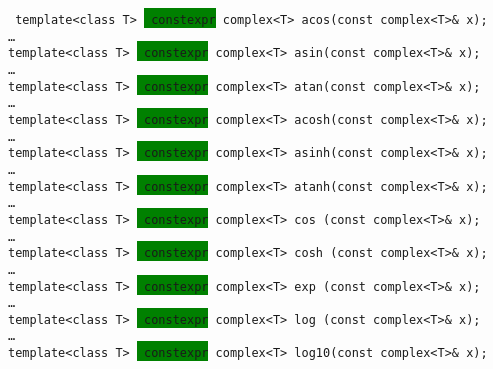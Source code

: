 \documentclass[prd,twocolumn,amsmath,amssymb,nofootinbib,eqsecnum]{revtex4-1}
\newcommand{\code}[1]{{\tt #1}}
\newcommand{\highlight}[1]{\colorbox{green}{\!\!\!\! #1}}
\begin{document}
\code{
  	template<class T> \highlight{constexpr} complex<T> acos(const complex<T>\& x);\\

	\ldots\\

	template<class T> \highlight{constexpr} complex<T> asin(const complex<T>\& x);\\

	\ldots\\

	template<class T> \highlight{constexpr} complex<T> atan(const complex<T>\& x);\\

	\ldots\\

  	template<class T> \highlight{constexpr} complex<T> acosh(const complex<T>\& x);\\

	\ldots\\

	template<class T> \highlight{constexpr} complex<T> asinh(const complex<T>\& x);\\

	\ldots\\

	template<class T> \highlight{constexpr} complex<T> atanh(const complex<T>\& x);\\

	\ldots\\

	template<class T> \highlight{constexpr} complex<T> cos  (const complex<T>\& x);\\

	\ldots\\

	template<class T> \highlight{constexpr} complex<T> cosh (const complex<T>\& x);\\

	\ldots\\
	
	template<class T> \highlight{constexpr} complex<T> exp  (const complex<T>\& x);\\

	\ldots\\

 	template<class T> \highlight{constexpr} complex<T> log  (const complex<T>\& x);\\

	\ldots\\

	template<class T> \highlight{constexpr} complex<T> log10(const complex<T>\& x);\\

}
\end{document}
